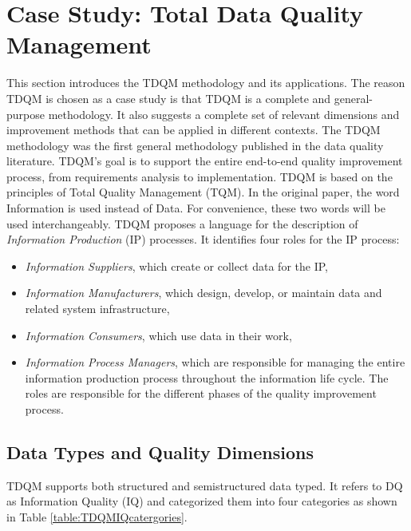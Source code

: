 \documentclass[pdftex,english,oribibl]{llncs}
\begin{document}
\section{Case Study: Total Data Quality Management}\label{sec:TDQM}


This section introduces the TDQM methodology and its applications.  The reason TDQM is chosen as a case study is that TDQM is a complete and general-purpose methodology. It also suggests a complete set of relevant dimensions and improvement methods that can be applied in different contexts.
The TDQM methodology was the first general methodology published in the data quality literature. \cite{Wang1998TDQM}
TDQM's goal is to support the entire end-to-end quality improvement process, from requirements analysis to implementation.
TDQM is based on the principles of Total Quality Management (TQM). \cite{OAKLAND1999TQM}  In the original paper, the word Information is used instead of Data. For convenience, these two words will be used interchangeably. TDQM proposes a language for the description of \emph{Information Production} (IP) processes.  It identifies four roles for the IP process:
\begin{itemize}
    \item \emph{Information Suppliers}, which create or collect data for the IP,
    \item \emph{Information Manufacturers}, which design, develop, or maintain data and related system infrastructure,
    \item \emph{Information Consumers}, which use data in their work,
    \item \emph{Information Process Managers}, which are responsible for managing the entire information production process throughout the information life cycle.
The roles are responsible for the different phases of the quality improvement process.
\end{itemize}
\subsection{Data Types and Quality Dimensions}
TDQM supports both structured and semistructured data typed. It refers to DQ as Information Quality (IQ) and categorized them into four categories as shown in Table \ref{table:TDQMIQcatergories}.
\end{document}
